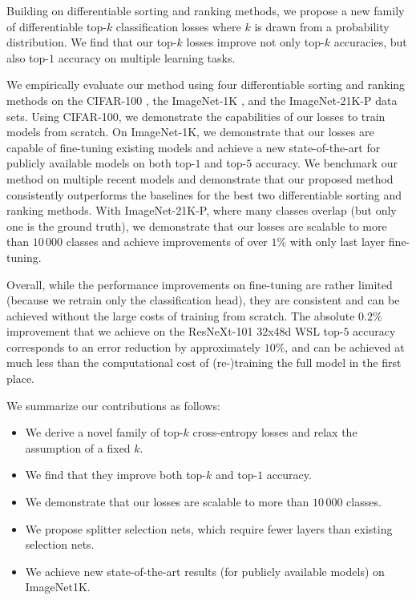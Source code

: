\documentclass{article}
\begin{document}
Building on differentiable sorting and ranking methods, we propose a new family of differentiable top-$k$ classification losses where $k$ is drawn from a probability distribution.
We find that our top-$k$ losses improve not only top-$k$ accuracies, but 
also top-$1$ accuracy on multiple learning tasks.

We empirically evaluate our method using four differentiable sorting and ranking methods on the CIFAR-100 \citep{Krizhevsky2009_cifar10}, the ImageNet-1K \citep{deng2009imagenet}, and the ImageNet-21K-P \citep{ridnik2021imagenet} data sets.
Using CIFAR-100, we demonstrate the capabilities of our losses to train models from scratch.
On ImageNet-1K, we demonstrate that our losses are capable of fine-tuning existing models and achieve a new state-of-the-art for publicly available models on both top-$1$ and top-$5$ accuracy.
We benchmark our method on multiple recent models and demonstrate that our proposed method consistently outperforms the baselines for the best two differentiable sorting and ranking methods.
With ImageNet-21K-P, where many classes overlap (but only one is the ground truth), we demonstrate that our losses are scalable to more than $10\,000$ classes and achieve improvements of over $1\%$ with only last layer fine-tuning.

Overall, while the performance improvements on fine-tuning are rather limited (because we retrain only the classification head), they are consistent and can be achieved without the large costs of training from scratch.
The absolute $0.2\%$ improvement that we achieve on the ResNeXt-101 32x48d WSL top-$5$ accuracy corresponds to an error reduction by approximately $10\%$, and can be achieved at much less than 
the computational cost of (re-)training the full model in the first place.  





We summarize our contributions as follows:
\vspace*{-.45em}
\begin{itemize}
\setlength{\itemindent}{-1.em}
\itemsep0pt
    \item We derive a novel family of top-$k$ cross-entropy losses and relax the assumption of a fixed $k$.
    \item We find that they improve both top-$k$ and top-$1$ accuracy.
    \item We demonstrate that our losses are scalable to more than $10\,000$ classes.
    \item We propose splitter selection nets, which require fewer layers than existing selection nets.
    \item We achieve new state-of-the-art results (for publicly available models) on ImageNet1K.
\end{itemize}
\vspace*{-.5em}
\end{document}
